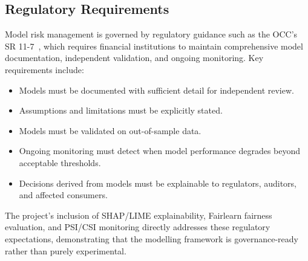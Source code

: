 \subsection{Regulatory Requirements}

Model risk management is governed by regulatory guidance such as the OCC's SR 11-7~\cite{occ2011}, which requires financial institutions to maintain comprehensive model documentation, independent validation, and ongoing monitoring. Key requirements include:

\begin{itemize}
    \item Models must be documented with sufficient detail for independent review.
    \item Assumptions and limitations must be explicitly stated.
    \item Models must be validated on out-of-sample data.
    \item Ongoing monitoring must detect when model performance degrades beyond acceptable thresholds.
    \item Decisions derived from models must be explainable to regulators, auditors, and affected consumers.
\end{itemize}

The project's inclusion of SHAP/LIME explainability, Fairlearn fairness evaluation, and PSI/CSI monitoring directly addresses these regulatory expectations, demonstrating that the modelling framework is governance-ready rather than purely experimental.
